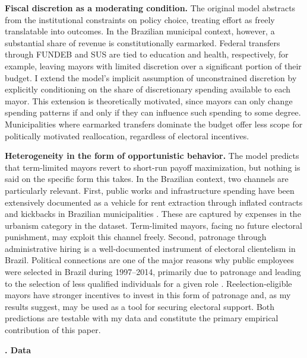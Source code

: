 \documentclass[12pt, a4paper]{article}
\newcounter{headercounter}
\newcommand{\header}[1]{\begin{center}{\large \textbf{\Roman{headercounter}. #1}} \end{center} \stepcounter{headercounter}}
\begin{document}
\textbf{Fiscal discretion as a moderating condition.} The original model abstracts from the institutional constraints on policy choice, treating effort as freely translatable into outcomes. In the Brazilian municipal context, however, a substantial share of revenue is constitutionally earmarked. Federal transfers through FUNDEB and SUS are tied to education and health, respectively, for example, leaving mayors with limited discretion over a significant portion of their budget. I extend the model's implicit assumption of unconstrained discretion by explicitly conditioning on the share of discretionary spending available to each mayor. This extension is theoretically motivated, since mayors can only change spending patterns if and only if they can influence such spending to some degree. Municipalities where earmarked transfers dominate the budget offer less scope for politically motivated reallocation, regardless of electoral incentives.

\textbf{Heterogeneity in the form of opportunistic behavior.} The model predicts that term-limited mayors revert to short-run payoff maximization, but nothing is said on the specific form this takes. In the Brazilian context, two channels are particularly relevant. First, public works and infrastructure spending have been extensively documented as a vehicle for rent extraction through inflated contracts and kickbacks in Brazilian municipalities \cite{ferraz:2011}. These are captured by expenses in the urbanism category in the dataset. Term-limited mayors, facing no future electoral punishment, may exploit this channel freely. Second, patronage through administrative hiring is a well-documented instrument of electoral clientelism in Brazil. Political connections are one of the major reasons why public employees were selected in Brazil during 1997--2014, primarily due to patronage and leading to the selection of less qualified individuals for a given role \cite{colonnelli:2020}. Reelection-eligible mayors have stronger incentives to invest in this form of patronage and, as my results suggest, may be used as a tool for securing electoral support. Both predictions are testable with my data and constitute the primary empirical contribution of this paper.

\header{Data}
\end{document}
